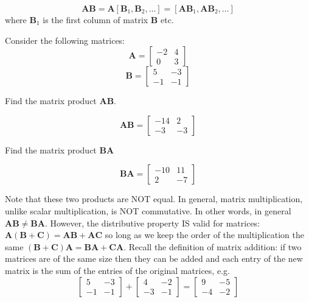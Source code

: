 \[\mathbf{A} \mathbf{B} = \mathbf{A} [\mathbf{B}_1, \mathbf{B}_2, \ldots] = [\mathbf{A} \mathbf{B}_1, \mathbf{A} \mathbf{B}_2, \ldots] \]
where $\mathbf{B}_1$ is the first column of matrix $\mathbf{B}$ etc.

Consider the following matrices:
\[ \mathbf{A} =
\left[\begin{array}{rr}
-2 & 4 \\
0 & 3
\end{array}\right]
\]
\[ \mathbf{B} =
\left[\begin{array}{rr}
5 & -3 \\
-1 & -1
\end{array}\right]
\]
\begin{prob}
Find the matrix product $\mathbf{A} \mathbf{B}$.
\end{prob}
\begin{sol}
\[ \mathbf{AB} =
\left[\begin{array}{rr}
-14 & 2 \\
-3 & -3
\end{array}\right]
\]
\end{sol}
\begin{prob}
Find the matrix product $\mathbf{B} \mathbf{A}$
\end{prob}
\begin{sol}
\[ \mathbf{BA} =
\left[\begin{array}{rr}
-10 & 11 \\
2 & -7
\end{array}\right]
\]
\end{sol}

Note that these two products are NOT equal.  In general, matrix multiplication, unlike scalar multiplication, is NOT commutative.  In other words, in general $\mathbf{A} \mathbf{B} \neq \mathbf{B} \mathbf{A}$.  However, the distributive property IS valid for matrices:  $\mathbf{A} (\mathbf{B} + \mathbf{C}) = \mathbf{A} \mathbf{B} + \mathbf{A} \mathbf{C}$ so long as we keep the order of the multiplication the same $(\mathbf{B} + \mathbf{C})\mathbf{A} = \mathbf{B} \mathbf{A} + \mathbf{C} \mathbf{A}$.  Recall the definition of matrix addition: if two matrices are of the same size then they can be added and each entry of the new matrix is the sum of the entries of the original matrices, e.g.
\[\left[\begin{array}{rr}
5 & -3 \\
-1 & -1
\end{array}\right] + \left[\begin{array}{rr}
4 & -2 \\
-3 & -1
\end{array}\right] = \left[\begin{array}{rr}
9 & -5 \\
-4 & -2
\end{array}\right]
\]

